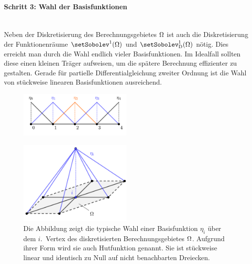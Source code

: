 \documentclass[crop=false]{standalone}
\begin{document}
      \paragraph{Schritt 3: Wahl der Basisfunktionen} %
      \label{par:schritt_3_wahl_der_basisfunktionen}
        \hfill\\
        Neben der Diskretisierung des Berechnungsgebietes $\Omega$ ist auch die Diskretisierung der Funktionenräume $\setSobolev^1(\domain)$ und $\setSobolev^1_\mathrm{D}(\domain)$ nötig.
        Dies erreicht man durch die Wahl endlich vieler Basisfunktionen.
        Im Idealfall sollten diese einen kleinen Träger aufweisen, um die spätere Berechnung effizienter zu gestalten.
        Gerade für partielle Differentialgleichung zweiter Ordnung ist die Wahl von stückweise linearen Basisfunktionen ausreichend.
        \begin{figure}[h]
          \center
          \includegraphics[width=0.5\textwidth]{images/hat_function_one_dimension_example.pdf}
          \caption{}
          \label{fig:hat-function-example}
        \end{figure}
        \begin{figure}[h]
          \center
          \includegraphics[width=0.5\textwidth]{images/hat_function.pdf}
          \caption{%
            Die Abbildung zeigt die typische Wahl einer Basisfunktion $η_i$ über dem $i$.~Vertex des diskretisierten Berechnungsgebietes $\Omega$.
            Aufgrund ihrer Form wird sie auch Hutfunktion genannt.
            Sie ist stückweise linear und identisch zu Null auf nicht benachbarten Dreiecken.%
          }
          \label{fig:hat-function}
        \end{figure}
\end{document}
